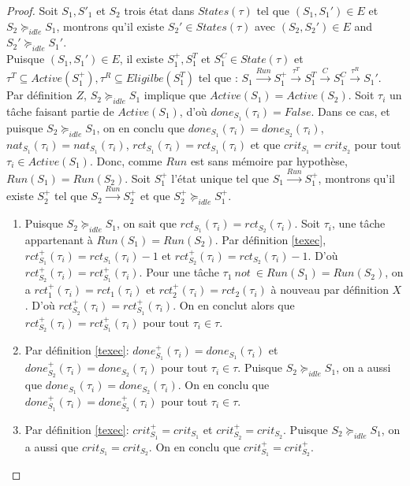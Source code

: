 \documentclass[a4paper]{report}
\theoremstyle{break}
\theoremstyle{breakplain}
\begin{document}
\begin{proof}
Soit $S_1, S'_1$ et $S_2$ trois état dans $States(\tau)$ tel que $(S_1, S_1') \in E$ et $S_2 \succeq_{idle}S_1$, montrons qu'il existe $S_2' \in States(\tau)$ avec $(S_2, S_2') \in E$ and $S_2' \succeq_{idle} S_1'$.\\

Puisque $(S_1, S_1') \in E$, il existe $S^{+}_1, S^{T}_1$ et $S^{C}_1 \in State(\tau)$ et $\tau^T \subseteq Active(S^{+}_1),\tau^R \subseteq Eligilbe(S^{T}_1) $ tel que : $S_1\xrightarrow{Run}S^{+}_1\xrightarrow{\tau^T}S^{T}_1\xrightarrow{C}S^{C}_1\xrightarrow{\tau^R}S_1'$.\\

Par définition $Z$, $S_2 \succeq_{idle} S_1$ implique que $Active(S_1) = Active(S_2)$. Soit $\tau_i$ un tâche faisant partie de $Active(S_1)$, d'où $done_{S_1}(\tau_i) = False$. Dans ce cas, et puisque $S_2 \succeq_{idle} S_1$, on en conclu que $done_{S_1}(\tau_i) = done_{S_2}(\tau_i)$, $nat_{S_1}(\tau_i) = nat_{S_1}(\tau_i)$, $rct_{S_1}(\tau_i) = rct_{S_1}(\tau_i)$ et que $crit_{S_1} = crit_{S_2}$ pour tout $\tau_i \in Active(S_1)$. Donc, comme $Run$ est sans mémoire par hypothèse, $Run(S_1) = Run(S_2)$. Soit $S^+_1$ l'état unique tel que $S_1\xrightarrow{Run}S^{+}_1$, montrons qu'il existe $S^+_2$ tel que $S_2\xrightarrow{Run}S^{+}_2$ et que $S^+_2 \succeq_{idle} S^+_1$.
\begin{enumerate}
\item Puisque $S_2 \succeq_{idle} S_1$, on sait que $rct_{S_1}(\tau_i) = rct_{S_2}(\tau_i)$. Soit $\tau_i$, une tâche appartenant à $Run(S_1) = Run(S_2)$. Par définition \ref{texec}, $rct_{S_1}^+(\tau_i) = rct_{S_1}(\tau_i) -1$ et $rct_{S_2}^+(\tau_i) = rct_{S_2}(\tau_i) -1$. D'où $rct_{S_2}^+(\tau_i) = rct_{S_1}^+(\tau_i)$. Pour une tâche $\tau_1\ not\ \in Run(S_1) = Run(S_2)$, on a $rct_1^+(\tau_i) = rct_1(\tau_i)$ et $rct_2^+(\tau_i) = rct_2(\tau_i)$ à nouveau par définition $X$. D'où $rct_{S_2}^+(\tau_i) = rct_{S_1}^+(\tau_i)$. On en conclut alors que $rct_{S_2}^+(\tau_i) = rct_{S_1}^+(\tau_i)$ pour tout $\tau_i \in \tau$.
\item Par définition \ref{texec}: $done_{S_1}^+(\tau_i) = done_{S_1}(\tau_i)$ et $done_{S_2}^+(\tau_i) = done_{S_2}(\tau_i)$ pour tout $\tau_i \in \tau$. Puisque $S_2 \succeq_{idle} S_1$, on a aussi que $done_{S_1}(\tau_i) = done_{S_2}(\tau_i)$. On en conclu que $done_{S_1}^+(\tau_i) = done_{S_2}^+(\tau_i)$ pour tout $\tau_i \in \tau$.
\item Par définition \ref{texec}: $crit_{S_1}^+ = crit_{S_1}$ et $crit_{S_2}^+ = crit_{S_2}$. Puisque $S_2 \succeq_{idle} S_1$, on a aussi que $crit_{S_1} = crit_{S_2}$. On en conclu que $crit_{S_1}^+ = crit_{S_2}^+$.

\end{enumerate}
\end{proof}
\end{document}
